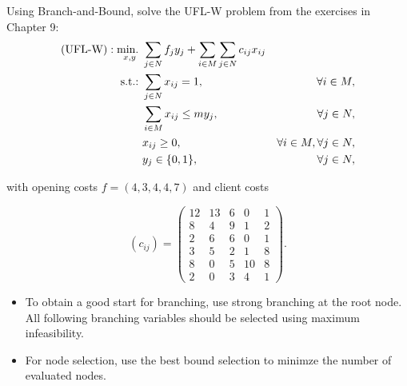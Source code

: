 Using Branch-and-Bound, solve the UFL-W problem from the exercises in Chapter 9:
\begin{align}
    \text{(UFL-W)} : \mathop{\text{min.~}}_{x,y} & \sum_{j\in N} f_jy_j + \sum_{i\in M}\sum_{j\in N} c_{ij}x_{ij}\\
    \mathop{\text{s.t.:~}} & \sum_{j\in N}x_{ij} = 1, &\forall i \in M,\\
        & \sum_{i\in M}x_{ij} \leq my_j, &\forall  j \in N,\\
        & x_{ij} \geq 0, &\forall i \in M, \forall j \in N,\\
        & y_j \in \{0,1\}, &\forall j\in N,
\end{align}

with opening costs $f=(4,3,4,4,7)$ and client costs

\begin{equation*}
 (c_{ij}) = \left(
	\begin{array}{ccccc}
		12 & 13 & 6 & 0  & 1 \\
		8  & 4  & 9 & 1  & 2 \\
		2  & 6  & 6 & 0  & 1 \\
		3  & 5  & 2 & 1  & 8 \\
		8  & 0  & 5 & 10 & 8 \\
		2  & 0  & 3 & 4  & 1
	\end{array}
 \right).
\end{equation*}

\begin{itemize}
 \item To obtain a good start for branching, use strong branching at the root node. All following branching variables should be selected using maximum infeasibility.
 \item For node selection, use the best bound selection to minimze the number of evaluated nodes.
\end{itemize}